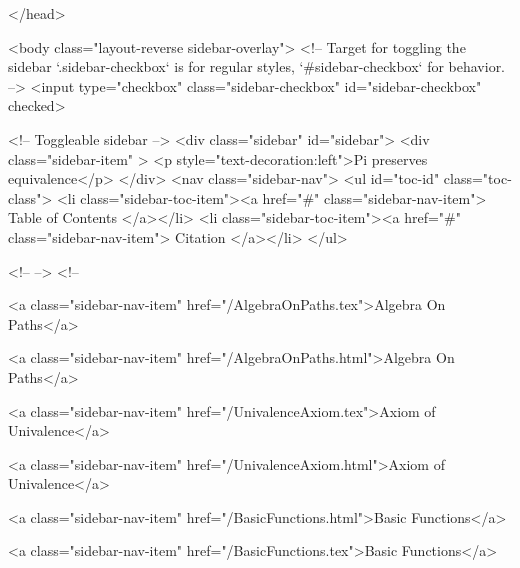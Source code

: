   
</head>




  <body class="layout-reverse sidebar-overlay">
    <!-- Target for toggling the sidebar `.sidebar-checkbox` is for regular
     styles, `#sidebar-checkbox` for behavior. -->
<input type="checkbox" class="sidebar-checkbox" id="sidebar-checkbox" checked>

<!-- Toggleable sidebar -->
<div class="sidebar" id="sidebar">
  <div class="sidebar-item" >
    <p style="text-decoration:left">Pi preserves equivalence</p>
  </div>
  <nav class="sidebar-nav">
    <ul id="toc-id" class="toc-class">
  <li class="sidebar-toc-item"><a href="#" class="sidebar-nav-item"> Table of Contents </a></li>
  <li class="sidebar-toc-item"><a href="#" class="sidebar-nav-item"> Citation </a></li>
</ul>


    <!--  -->
    <!-- 
      
    
      
    
      
    
      
        
      
    
      
        
          <a class="sidebar-nav-item" href="/AlgebraOnPaths.tex">Algebra On Paths</a>
        
      
    
      
        
          <a class="sidebar-nav-item" href="/AlgebraOnPaths.html">Algebra On Paths</a>
        
      
    
      
        
          <a class="sidebar-nav-item" href="/UnivalenceAxiom.tex">Axiom of Univalence</a>
        
      
    
      
        
          <a class="sidebar-nav-item" href="/UnivalenceAxiom.html">Axiom of Univalence</a>
        
      
    
      
        
          <a class="sidebar-nav-item" href="/BasicFunctions.html">Basic Functions</a>
        
      
    
      
        
          <a class="sidebar-nav-item" href="/BasicFunctions.tex">Basic Functions</a>
        
      
    
